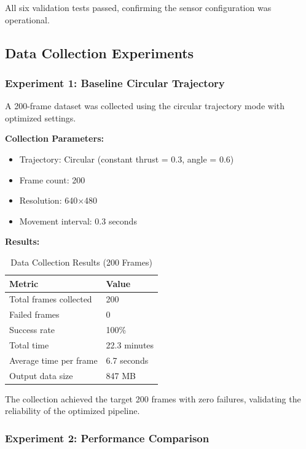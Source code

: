 All six validation tests passed, confirming the sensor configuration was operational.

\subsection{Data Collection Experiments}

\subsubsection{Experiment 1: Baseline Circular Trajectory}

A 200-frame dataset was collected using the circular trajectory mode with optimized settings.

\textbf{Collection Parameters:}
\begin{itemize}
    \item Trajectory: Circular (constant thrust = 0.3, angle = 0.6)
    \item Frame count: 200
    \item Resolution: 640$\times$480
    \item Movement interval: 0.3 seconds
\end{itemize}

\textbf{Results:}

\begin{table}[htbp]
\centering
\caption{Data Collection Results (200 Frames)}
\label{tab:collection_results}
\begin{tabular}{@{}ll@{}}
\toprule
\textbf{Metric} & \textbf{Value} \\
\midrule
Total frames collected & 200 \\
Failed frames & 0 \\
Success rate & 100\% \\
Total time & 22.3 minutes \\
Average time per frame & 6.7 seconds \\
Output data size & 847 MB \\
\bottomrule
\end{tabular}
\end{table}

The collection achieved the target 200 frames with zero failures, validating the reliability of the optimized pipeline.

\subsubsection{Experiment 2: Performance Comparison}

